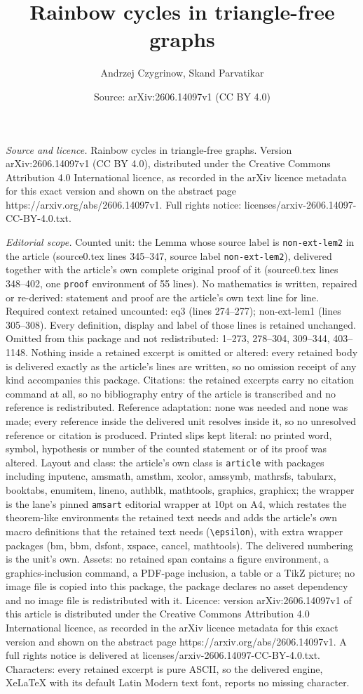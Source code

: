 \documentclass[10pt,a4paper]{amsart}
\title[Rainbow cycles in triangle-free graphs]{Rainbow cycles in triangle-free graphs}
\author{Andrzej Czygrinow, Skand Parvatikar}
\date{Source: arXiv:2606.14097v1 (CC BY 4.0)}
\begin{document}
\maketitle

\noindent\emph{Source and licence.} Rainbow cycles in triangle-free graphs. Version arXiv:2606.14097v1 (CC BY 4.0), distributed under the Creative Commons Attribution 4.0 International licence, as recorded in the arXiv licence metadata for this exact version and shown on the abstract page https://arxiv.org/abs/2606.14097v1. Full rights notice: licenses/arxiv-2606.14097-CC-BY-4.0.txt.\par\smallskip

\noindent\textit{Editorial scope.} Counted unit: the Lemma whose source label is \texttt{non-ext-lem2} in the article (source0.tex lines 345--347, source label \texttt{non-ext-lem2}), delivered together with the article's own complete original proof of it (source0.tex lines 348--402, one \texttt{proof} environment of 55 lines). No mathematics is written, repaired or re-derived: statement and proof are the article's own text line for line. Required context retained uncounted: eq3 (lines 274--277); non-ext-lem1 (lines 305--308). Every definition, display and label of those lines is retained unchanged. Omitted from this package and not redistributed: 1--273, 278--304, 309--344, 403--1148. Nothing inside a retained excerpt is omitted or altered: every retained body is delivered exactly as the article's lines are written, so no omission receipt of any kind accompanies this package. Citations: the retained excerpts carry no citation command at all, so no bibliography entry of the article is transcribed and no reference is redistributed. Reference adaptation: none was needed and none was made; every reference inside the delivered unit resolves inside it, so no unresolved reference or citation is produced. Printed slips kept literal: no printed word, symbol, hypothesis or number of the counted statement or of its proof was altered. Layout and class: the article's own class is \texttt{article} with packages including inputenc, amsmath, amsthm, xcolor, amssymb, mathrsfs, tabularx, booktabs, enumitem, lineno, authblk, mathtools, graphics, graphicx; the wrapper is the lane's pinned \texttt{amsart} editorial wrapper at 10pt on A4, which restates the theorem-like environments the retained text needs and adds the article's own macro definitions that the retained text needs (\texttt{\textbackslash epsilon}), with extra wrapper packages (bm, bbm, dsfont, xspace, cancel, mathtools). The delivered numbering is the unit's own. Assets: no retained span contains a figure environment, a graphics-inclusion command, a PDF-page inclusion, a table or a TikZ picture; no image file is copied into this package, the package declares no asset dependency and no image file is redistributed with it. Licence: version arXiv:2606.14097v1 of this article is distributed under the Creative Commons Attribution 4.0 International licence, as recorded in the arXiv licence metadata for this exact version and shown on the abstract page https://arxiv.org/abs/2606.14097v1. A full rights notice is delivered at licenses/arxiv-2606.14097-CC-BY-4.0.txt. Characters: every retained excerpt is pure ASCII, so the delivered engine, XeLaTeX with its default Latin Modern text font, reports no missing character.
\end{document}
